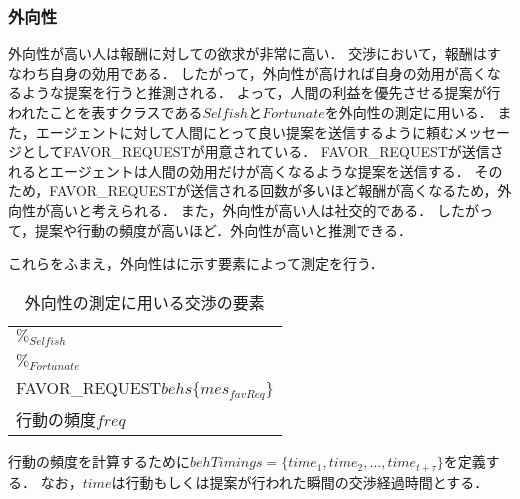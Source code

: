 \subsubsection{外向性}
外向性が高い人は報酬に対しての欲求が非常に高い．
交渉において，報酬はすなわち自身の効用である．
したがって，外向性が高ければ自身の効用が高くなるような提案を行うと推測される．
よって，人間の利益を優先させる提案が行われたことを表すクラスである$\mathit{Selfish}$と$Fortunate$を外向性の測定に用いる．
また，エージェントに対して人間にとって良い提案を送信するように頼むメッセージとしてFAVOR\_REQUESTが用意されている．
FAVOR\_REQUESTが送信されるとエージェントは人間の効用だけが高くなるような提案を送信する．
そのため，FAVOR\_REQUESTが送信される回数が多いほど報酬が高くなるため，外向性が高いと考えられる．
また，外向性が高い人は社交的である．
したがって，提案や行動の頻度が高いほど．外向性が高いと推測できる．

これらをふまえ，外向性はに示す要素によって測定を行う．

\begin{table}[tb]
    \centering
    \caption{外向性の測定に用いる交渉の要素}
    \begin{tabular}{l} \toprule
        $\%_{\mathit{Selfish}}$ \\
        $\%_{Fortunate}$ \\
        FAVOR\_REQUEST$behs\{mes_{\mathit{favReq}}\}$ \\
        行動の頻度$\mathit{freq}$ \\ \bottomrule
    \end{tabular}
    \label{tab:extraversion}
\end{table}

行動の頻度を計算するために$behTimings = \{time_1, time_2 , \ldots , time_{t+\tau}\}$を定義する．
なお，$time$は行動もしくは提案が行われた瞬間の交渉経過時間とする．

